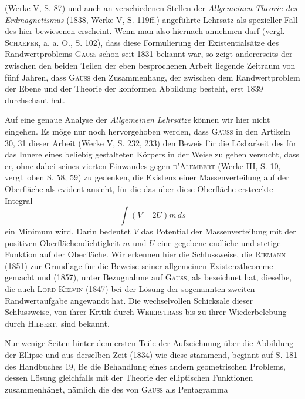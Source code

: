 (Werke V, S. 87) und auch an verschiedenen Stellen der \textit{Allgemeinen Theorie
des Erdmagnetismus} (1838, Werke V, S. 119ff.) angeführte Lehrsatz als spezieller
Fall des hier bewiesenen erscheint. Wenn man also hiernach annehmen
darf (vergl. \textsc{Schaefer}, a. a. O., S. 102), dass diese Formulierung der Existentialsätze
des Randwertproblems \textsc{Gauss} schon seit 1831 bekannt war, so zeigt andererseits
der zwischen den beiden Teilen der eben besprochenen Arbeit liegende
Zeitraum von fünf Jahren, dass \textsc{Gauss} den Zusammenhang, der zwischen dem
Randwertproblem der Ebene und der Theorie der konformen Abbildung besteht,
erst 1839 durchschaut hat.
\par
Auf eine genaue Analyse der \textit{Allgemeinen Lehrsätze} können wir hier
nicht eingehen. Es möge nur noch hervorgehoben werden, dass \textsc{Gauss} in
den Artikeln 30, 31 dieser Arbeit (Werke V, S. 232, 233) den Beweis für
die Lösbarkeit des  für das Innere eines beliebig gestalteten
Körpers in der Weise zu geben versucht, dass er, ohne dabei seines
vierten Einwandes gegen \textsc{d’Alembert} (Werke III, S. 10, vergl. oben S. 58,
59) zu gedenken, die Existenz einer Massenverteilung auf der Oberfläche als
evident ansieht, für die das über diese Oberfläche erstreckte Integral
\[
\int(V-2U)m\,ds
\]
ein Minimum wird. Darin bedeutet \(V\) das Potential der Massenverteilung
mit der positiven Oberflächendichtigkeit \(m\) und \(U\) eine gegebene endliche und
stetige Funktion auf der Oberfläche. Wir erkennen hier die Schlussweise,
die \textsc{Riemann} (1851) zur Grundlage für die Beweise seiner allgemeinen Existenztheoreme
gemacht und (1857), unter Bezugnahme auf \textsc{Gauss}, als  bezeichnet hat, dieselbe, die auch \textsc{Lord Kelvin} (1847) bei
der Lösung der sogenannten zweiten Randwertaufgabe angewandt hat. Die
wechselvollen Schicksale dieser Schlussweise, von ihrer Kritik durch \textsc{Weierstrass}
bis zu ihrer Wiederbelebung durch \textsc{Hilbert}, sind bekannt.
\par\clearpage{}
\noindent\hspace*{\parindent}Nur wenige Seiten hinter dem ersten Teile der Aufzeichnung über die
Abbildung der Ellipse und aus derselben Zeit (1834) wie diese stammend,
beginnt auf S. 181 des Handbuches 19, Be die Behandlung eines andern geometrischen
Problems, dessen Lösung gleichfalls mit der Theorie der elliptischen
Funktionen zusammenhängt, nämlich die des von \textsc{Gauss} als Pentagramma
